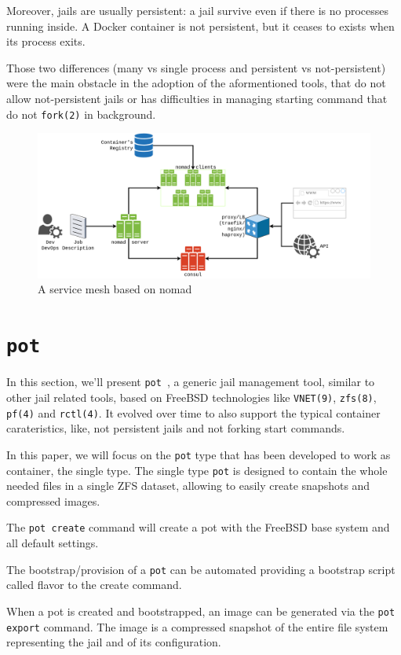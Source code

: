 \documentclass[conference,a4paper,11pt]{IEEEtran}
\begin{document}
Moreover, jails are usually persistent: a jail survive even if there is no processes running inside. A Docker container is not persistent, but it ceases to exists when its process exits.

Those two differences (many vs single process and persistent vs not-persistent) were the main obstacle in the adoption of the aformentioned tools, that do not allow not-persistent jails or has difficulties in managing starting command that do not \texttt{fork(2)} in background.

\begin{figure}[hbt]
\centering
\includegraphics[width=\textwidth]{nomad-frame.png}
\caption{A service mesh based on nomad}
\label{fig:nomad}
\end{figure}
\section{\texttt{pot}}\label{sec:pot}
In this section, we'll present \texttt{pot}~\cite{pot}, a generic jail management tool, similar to other jail related tools, based on FreeBSD technologies like \texttt{VNET(9)}, \texttt{zfs(8)}, \texttt{pf(4)} and \texttt{rctl(4)}. It evolved over time to also support the typical container carateristics, like, not persistent jails and not forking start commands.

In this paper, we will focus on the \texttt{pot} type that has been developed to work as container, the single type.
The single type \texttt{pot} is designed to contain the whole needed files in a single ZFS dataset, allowing to easily create snapshots and compressed images.

The \texttt{pot create} command will create a pot with the FreeBSD base system and all default settings.

The bootstrap/provision of a \texttt{pot} can be automated providing a bootstrap script called flavor to the create command.

When a pot is created and bootstrapped, an image can be generated via the \texttt{pot export} command. The image is a compressed snapshot of the entire file system representing the jail and of its configuration.
\end{document}
